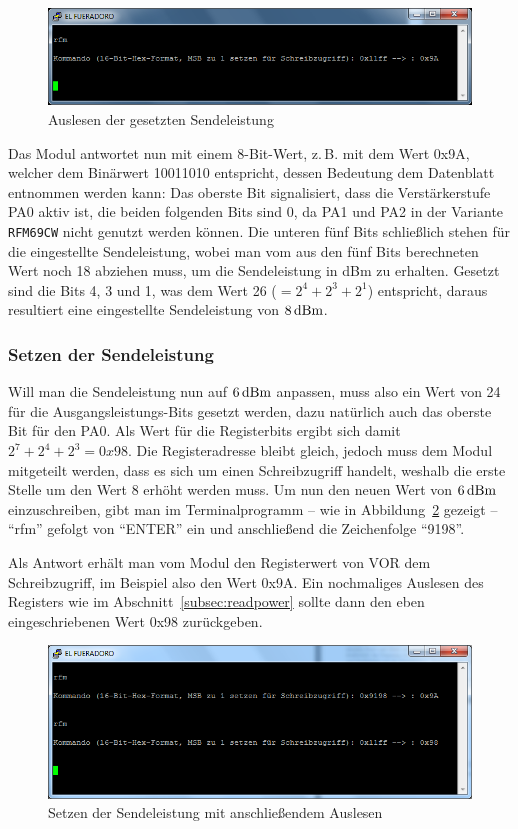 \documentclass[pdftex, parskip, numbers=noenddot, toc=listof]{scrbook}
\begin{document}
	\begin{figure}[b]
		\centering
		\includegraphics[width=.8\textwidth]{Bilder/rfmbefehl}
		\caption{Auslesen der gesetzten Sendeleistung}
		\label{fig:rfmread}
	\end{figure}

	Das Modul antwortet nun mit einem 8-Bit-Wert, z.\,B. mit dem Wert 0x9A, welcher dem Binärwert 10011010 entspricht, dessen Bedeutung dem Datenblatt entnommen werden kann: Das oberste Bit signalisiert, dass die Verstärkerstufe PA0 aktiv ist, die beiden folgenden Bits sind 0, da PA1 und PA2 in der Variante \texttt{RFM69CW} nicht genutzt werden können. Die unteren fünf Bits schließlich stehen für die eingestellte Sendeleistung, wobei man vom aus den fünf Bits berechneten Wert noch 18 abziehen muss, um die Sendeleistung in dBm zu erhalten. Gesetzt sind die Bits 4, 3 und 1, was dem Wert 26 ($= 2^4 + 2^3 + 2^1$) entspricht, daraus resultiert eine eingestellte Sendeleistung von $\unit[8]{dBm}$.

	\subsubsection{Setzen der Sendeleistung}

	Will man die Sendeleistung nun auf $\unit[6]{dBm}$ anpassen, muss also ein Wert von 24 für die Aus\-gangs\-lei\-stungs-Bits gesetzt werden, dazu natürlich auch das oberste Bit für den PA0. Als Wert für die Registerbits ergibt sich damit $2^7 + 2^4 + 2^3 = 0x98$. Die Registeradresse bleibt gleich, jedoch muss dem Modul mitgeteilt werden, dass es sich um einen Schreibzugriff handelt, weshalb die erste Stelle um den Wert 8 erhöht werden muss. Um nun den neuen Wert von $\unit[6]{dBm}$ einzuschreiben, gibt man im Terminalprogramm -- wie in Abbildung~\ref{fig:rfmwrite} gezeigt -- \enquote{rfm} gefolgt von \enquote{ENTER} ein und anschließend die Zeichenfolge \enquote{9198}.

	Als Antwort erhält man vom Modul den Registerwert von VOR dem Schreibzugriff, im Beispiel also den Wert 0x9A. Ein nochmaliges Auslesen des Registers wie im Abschnitt~\ref{subsec:readpower} sollte dann den eben eingeschriebenen Wert 0x98 zurückgeben.

	\begin{figure}[!h]
		\centering
		\includegraphics[width=.8\textwidth]{Bilder/rfmbefehl2}
		\caption{Setzen der Sendeleistung mit anschließendem Auslesen}
		\label{fig:rfmwrite}
	\end{figure}
	\clearpage
\end{document}
